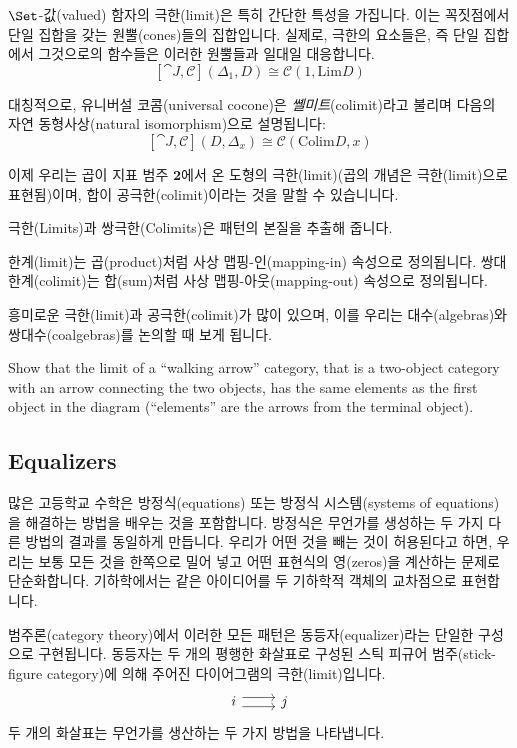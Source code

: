 \documentclass[DaoFP]{subfiles}
\begin{document}
$\Set$-값(valued) 함자의 극한(limit)은 특히 간단한 특성을 가집니다. 이는 꼭짓점에서 단일 집합을 갖는 원뿔(cones)들의 집합입니다. 실제로, 극한의 요소들은, 즉 단일 집합에서 그것으로의 함수들은 이러한 원뿔들과 일대일 대응합니다.
\[ [\cat J, \mathcal{C}](\Delta_1, D)  \cong \mathcal{C}(1, \text{Lim}D) \]


대칭적으로, 유니버설 코콤(universal cocone)은 \emph{쏄미트}(colimit)라고 불리며 다음의 자연 동형사상(natural isomorphism)으로 설명됩니다:
\[ [\cat J, \mathcal{C}](D, \Delta_x)  \cong \mathcal{C}( \text{Colim}D, x) \]


이제 우리는 곱이 지표 범주 $\mathbf{2}$에서 온 도형의 극한(limit)(곱의 개념은 극한(limit)으로 표현됨)이며, 합이 공극한(colimit)이라는 것을 말할 수 있습니니다.

극한(Limits)과 쌍극한(Colimits)은 패턴의 본질을 추출해 줍니다.

한계(limit)는 곱(product)처럼 사상 맵핑-인(mapping-in) 속성으로 정의됩니다. 쌍대 한계(colimit)는 합(sum)처럼 사상 맵핑-아웃(mapping-out) 속성으로 정의됩니다.

흥미로운 극한(limit)과 공극한(colimit)가 많이 있으며, 이를 우리는 대수(algebras)와 쌍대수(coalgebras)를 논의할 때 보게 됩니다.

\begin{exercise}
Show that the limit of a ``walking arrow'' category, that is a two-object category with an arrow connecting the two objects, has the same elements as the first object in the diagram (``elements'' are the arrows from the terminal object).
\end{exercise}

\subsection{Equalizers}

많은 고등학교 수학은 방정식(equations) 또는 방정식 시스템(systems of equations)을 해결하는 방법을 배우는 것을 포함합니다.
방정식은 무언가를 생성하는 두 가지 다른 방법의 결과를 동일하게 만듭니다.
우리가 어떤 것을 빼는 것이 허용된다고 하면, 우리는 보통 모든 것을 한쪽으로 밀어 넣고 어떤 표현식의 영(zeros)을 계산하는 문제로 단순화합니다.
기하학에서는 같은 아이디어를 두 기하학적 객체의 교차점으로 표현합니다.


범주론(category theory)에서 이러한 모든 패턴은 동등자(equalizer)라는 단일한 구성으로 구현됩니다. 동등자는 두 개의 평행한 화살표로 구성된 스틱 피규어 범주(stick-figure category)에 의해 주어진 다이어그램의 극한(limit)입니다.
\[
\begin{tikzcd}
i \arrow[r, shift left=0.75ex]
  \arrow[r, shift right=0.75ex]
&
j
\end{tikzcd}
\]
두 개의 화살표는 무언가를 생산하는 두 가지 방법을 나타냅니다.
\end{document}
